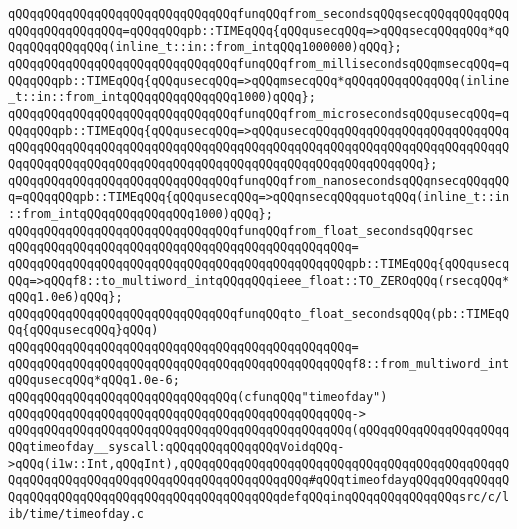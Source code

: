 \verb|qQQqqQQqqQQqqQQqqQQqqQQqqQQqqQQqfunqQQqfrom_secondsqQQqsecqQQqqQQqqQQqqQQqqQQqqQQqqQQq=qQQqqQQqpb::TIMEqQQq{qQQqusecqQQq=>qQQqsecqQQqqQQq*qQQqqQQqqQQqqQQq(inline_t::in::from_intqQQq1000000)qQQq};|\newline
\verb|qQQqqQQqqQQqqQQqqQQqqQQqqQQqqQQqfunqQQqfrom_millisecondsqQQqmsecqQQq=qQQqqQQqpb::TIMEqQQq{qQQqusecqQQq=>qQQqmsecqQQq*qQQqqQQqqQQqqQQq(inline_t::in::from_intqQQqqQQqqQQqqQQq1000)qQQq};|\newline
\verb|qQQqqQQqqQQqqQQqqQQqqQQqqQQqqQQqfunqQQqfrom_microsecondsqQQqusecqQQq=qQQqqQQqpb::TIMEqQQq{qQQqusecqQQq=>qQQqusecqQQqqQQqqQQqqQQqqQQqqQQqqQQqqQQqqQQqqQQqqQQqqQQqqQQqqQQqqQQqqQQqqQQqqQQqqQQqqQQqqQQqqQQqqQQqqQQqqQQqqQQqqQQqqQQqqQQqqQQqqQQqqQQqqQQqqQQqqQQqqQQqqQQqqQQqqQQq};|\newline
\verb|qQQqqQQqqQQqqQQqqQQqqQQqqQQqqQQqfunqQQqfrom_nanosecondsqQQqnsecqQQqqQQq=qQQqqQQqpb::TIMEqQQq{qQQqusecqQQq=>qQQqnsecqQQqquotqQQq(inline_t::in::from_intqQQqqQQqqQQqqQQq1000)qQQq};|\newline
\newline
\newline
\verb|qQQqqQQqqQQqqQQqqQQqqQQqqQQqqQQqfunqQQqfrom_float_secondsqQQqrsec|\newline
\verb|qQQqqQQqqQQqqQQqqQQqqQQqqQQqqQQqqQQqqQQqqQQqqQQq=|\newline
\verb|qQQqqQQqqQQqqQQqqQQqqQQqqQQqqQQqqQQqqQQqqQQqqQQqpb::TIMEqQQq{qQQqusecqQQq=>qQQqf8::to_multiword_intqQQqqQQqieee_float::TO_ZEROqQQq(rsecqQQq*qQQq1.0e6)qQQq};|\newline
\newline
\newline
\verb|qQQqqQQqqQQqqQQqqQQqqQQqqQQqqQQqfunqQQqto_float_secondsqQQq(pb::TIMEqQQq{qQQqusecqQQq}qQQq)|\newline
\verb|qQQqqQQqqQQqqQQqqQQqqQQqqQQqqQQqqQQqqQQqqQQqqQQq=|\newline
\verb|qQQqqQQqqQQqqQQqqQQqqQQqqQQqqQQqqQQqqQQqqQQqqQQqf8::from_multiword_intqQQqusecqQQq*qQQq1.0e-6;|\newline
\newline
\newline
\newline
\verb|qQQqqQQqqQQqqQQqqQQqqQQqqQQqqQQq(cfunqQQq"timeofday")|\newline
\verb|qQQqqQQqqQQqqQQqqQQqqQQqqQQqqQQqqQQqqQQqqQQqqQQq->|\newline
\verb|qQQqqQQqqQQqqQQqqQQqqQQqqQQqqQQqqQQqqQQqqQQqqQQq(qQQqqQQqqQQqqQQqqQQqqQQqtimeofday__syscall:qQQqqQQqqQQqqQQqVoidqQQq->qQQq(i1w::Int,qQQqInt),qQQqqQQqqQQqqQQqqQQqqQQqqQQqqQQqqQQqqQQqqQQqqQQqqQQqqQQqqQQqqQQqqQQqqQQqqQQqqQQqqQQqqQQq#qQQqtimeofdayqQQqqQQqqQQqqQQqqQQqqQQqqQQqqQQqqQQqqQQqqQQqqQQqqQQqdefqQQqinqQQqqQQqqQQqqQQqsrc/c/lib/time/timeofday.c|\newline
